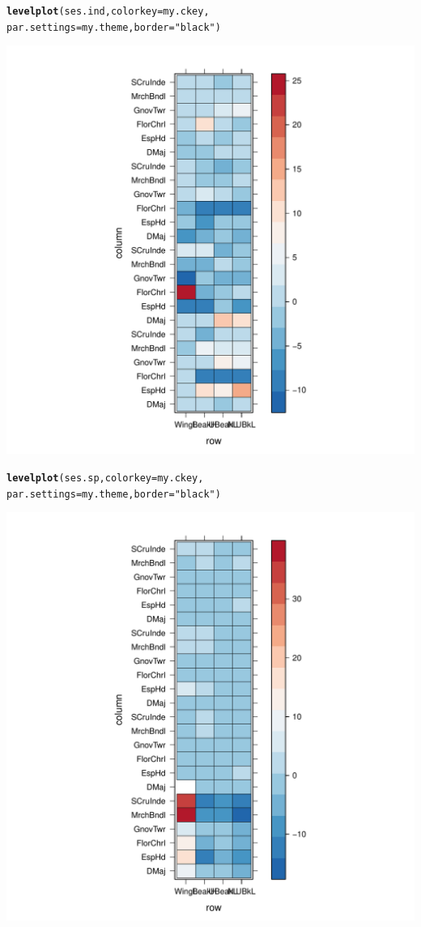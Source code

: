 \documentclass[12pt]{article}\usepackage[]{graphicx}\usepackage[]{color}
\makeatletter
\def\maxwidth{ %
  \ifdim\Gin@nat@width>\linewidth
    \linewidth
  \else
    \Gin@nat@width
  \fi
}
\newcommand{\hlstr}[1]{\textcolor[rgb]{0.192,0.494,0.8}{#1}}%
\newcommand{\hlstd}[1]{\textcolor[rgb]{0.345,0.345,0.345}{#1}}%
\newcommand{\hlkwc}[1]{\textcolor[rgb]{0.333,0.667,0.333}{#1}}%
\newcommand{\hlkwd}[1]{\textcolor[rgb]{0.737,0.353,0.396}{\textbf{#1}}}%
\newenvironment{kframe}{%
 \def\at@end@of@kframe{}%
 \ifinner\ifhmode%
  \def\at@end@of@kframe{\end{minipage}}%
  \begin{minipage}{\columnwidth}%
 \fi\fi%
 \def\FrameCommand##1{\hskip\@totalleftmargin \hskip-\fboxsep
 \colorbox{shadecolor}{##1}\hskip-\fboxsep
     \hskip-\linewidth \hskip-\@totalleftmargin \hskip\columnwidth}%
 \MakeFramed {\advance\hsize-\width
   \@totalleftmargin\z@ \linewidth\hsize
   \@setminipage}}%
 {\par\unskip\endMakeFramed%
 \at@end@of@kframe}
\newenvironment{knitrout}{}{} %
\makeatother
\begin{document}
\begin{knitrout}
\begin{kframe}
\begin{alltt}
\hlkwd{levelplot}\hlstd{(ses.ind,} \hlkwc{colorkey} \hlstd{= my.ckey,}
     \hlkwc{par.settings} \hlstd{= my.theme,}\hlkwc{border} \hlstd{=} \hlstr{"black"}\hlstd{)}
\end{alltt}
\end{kframe}
\includegraphics[width=\maxwidth]{figure/unnamed-chunk-651} 
\begin{kframe}\begin{alltt}
\hlkwd{levelplot}\hlstd{(ses.sp,} \hlkwc{colorkey} \hlstd{= my.ckey,}
     \hlkwc{par.settings} \hlstd{= my.theme,}\hlkwc{border} \hlstd{=} \hlstr{"black"}\hlstd{)}
\end{alltt}
\end{kframe}
\includegraphics[width=\maxwidth]{figure/unnamed-chunk-652} 

\end{knitrout}
\end{document}
